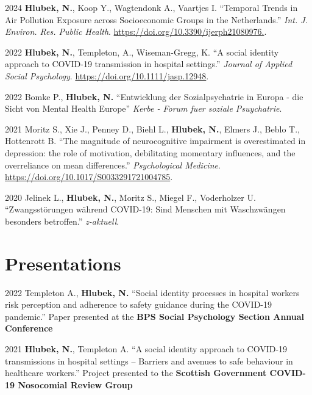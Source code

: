 \documentclass[12pt,letterpaper]{report}
\begin{document}
    \begin{tablist}
    
    	 \item[2024] \tab \textbf{Hlubek, N.}, Koop Y., Wagtendonk A., Vaartjes I. \enquote{Temporal Trends in Air Pollution Exposure across Socioeconomic Groups in the Netherlands.} \textit{Int. J. Environ. Res. Public Health}. \url{https://doi.org/10.3390/ijerph21080976.}.
	 
    	 \item[2022] \tab \textbf{Hlubek, N.}, Templeton, A., Wiseman-Gregg, K.  \enquote{A social identity approach to COVID-19 transmission in hospital settings.} \textit{Journal of Applied Social Psychology}. \url{https://doi.org/10.1111/jasp.12948}.
	     
    	 \item[2022] \tab Bomke P., \textbf{Hlubek, N.}  \enquote{Entwicklung der Sozialpsychatrie in Europa - die Sicht von Mental Health Europe} \textit{Kerbe - Forum fuer soziale Psuychatrie}.
	    
    	 \item[2021] \tab Moritz S., Xie J., Penney D., Biehl L., \textbf{Hlubek, N.}, Elmers J., Beblo T., Hottenrott B. \enquote{The magnitude of neurocognitive impairment is overestimated in depression: the role of motivation, debilitating momentary influences, and the overreliance on mean differences.} \textit{Psychological Medicine}. \url{https://doi.org/10.1017/S0033291721004785}.

    	 \item[2020] \tab Jelinek L., \textbf{Hlubek, N.}, Moritz S., Miegel F., Voderholzer U. \enquote{Zwangsstörungen während COVID-19: Sind Menschen mit Waschzwängen besonders betroffen.} \textit{z-aktuell}. 
       
    \end{tablist}
    
    \section*{Presentations}
    
    \begin{tablist}
    
    	 \item[2022] \tab Templeton A., \textbf{Hlubek, N.} \enquote{Social identity processes in hospital workers risk perception and adherence to safety guidance during the COVID-19 pandemic.} Paper presented at the \textbf{BPS Social Psychology Section Annual Conference}

         \item[2021] \tab \textbf{Hlubek, N.}, Templeton A. \enquote{A social identity approach to COVID-19 transmissions in hospital settings – Barriers and avenues to safe behaviour in healthcare workers.} Project presented to the \textbf{Scottish Government COVID-19 Nosocomial Review Group}
    
    \end{tablist}
\end{document}
